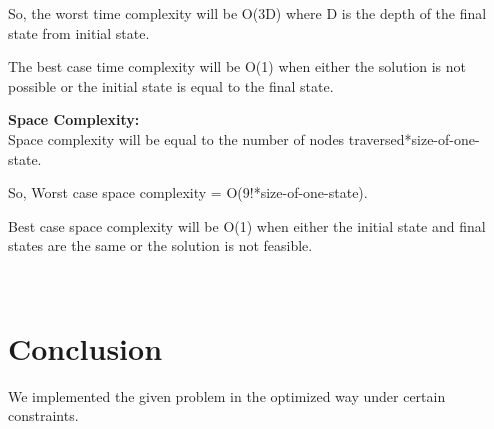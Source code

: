So, the worst time complexity will be O(3D) where D is the depth of the final state from initial state.

The best case time complexity will be O(1) when either the solution is not possible or the initial state is equal to the final state. 

\textbf{Space Complexity:} \\

Space complexity will be equal to the number of nodes traversed*size-of-one-state. 

So, Worst case space complexity = O(9!*size-of-one-state). 

Best case space complexity will be O(1) when either the initial state and final states are the same or the solution is not feasible.

\\
\section{Conclusion}
We implemented the given problem in the optimized way under certain constraints.


